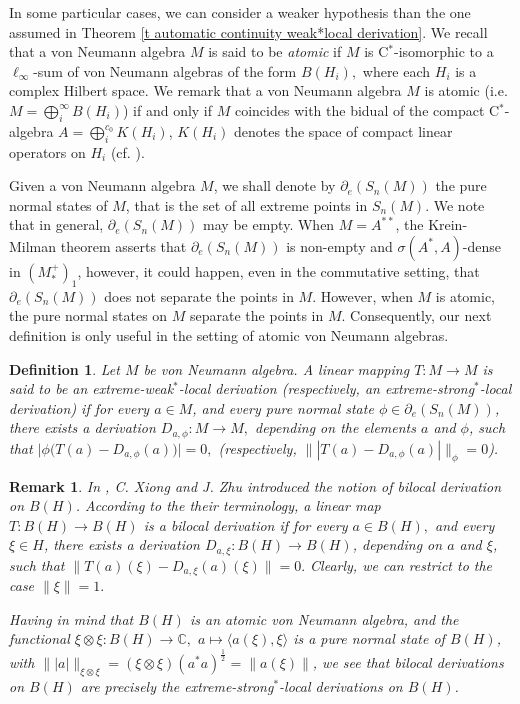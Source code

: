 \documentclass[11pt]{amsart}
\newtheorem{definition}[theorem]{Definition}
\newtheorem{remark}[theorem]{Remark}
\begin{document}
In some particular cases, we can consider a weaker hypothesis than the one assumed in Theorem \ref{t automatic continuity weak*local derivation}. We recall that a von Neumann algebra $M$ is said to be \emph{atomic} if $M$ is C$^*$-isomorphic to a $\ell_{\infty}$-sum of von Neumann algebras of the form $B(H_i),$ where each $H_i$ is a complex Hilbert space. We remark that a von Neumann algebra $M$ is atomic (i.e. $\displaystyle M= \bigoplus^{\infty}_{i} B(H_i)$) if and only if $M$ coincides with the bidual of the compact C$^*$-algebra $\displaystyle A= \bigoplus^{c_0}_{i} K(H_i)$, $K(H_i)$ denotes the space of compact linear operators on $H_i$ (cf. \cite[\S 1.19]{Sak}).\smallskip

Given a von Neumann algebra $M$, we shall denote by $\partial_{e} (S_n(M))$ the pure normal states of $M$, that is the set of all extreme points in $S_n(M)$. We note that in general, $\partial_{e} (S_n(M))$ may be empty. When $M= A^{**}$, the Krein-Milman theorem asserts that $\partial_{e} (S_n(M))$ is non-empty and $\sigma (A^*,A)$-dense in $\left(M_*^{+}\right)_1$, however, it could happen, even in the commutative setting, that $\partial_{e} (S_n(M))$ does not separate the points in $M$. However, when $M$ is atomic, the pure normal states on $M$ separate the points in $M$.
Consequently, our next definition is only useful in the setting of atomic von Neumann algebras.

\begin{definition}\label{def extreme weak$^*$-local derivation} Let $M$ be von Neumann algebra. A linear mapping $T: M \to M$ is said to be an extreme-weak$^*$-local derivation {\rm(}respectively, an extreme-strong$^*$-local derivation{\rm)} if for every $a\in M$, and every pure normal state $\phi\in \partial_{e} (S_n(M))$, there exists a derivation $D_{a,\phi}: M\to M,$ depending on the elements $a$ and $\phi$, such that $\Big|\phi \Big(T(a) - D_{a,\phi} (a)\Big)\Big|=0,$ {\rm(}respectively, $\||T(a) - D_{a,\phi} (a)|\|_{\phi }=0${\rm)}.
\end{definition}

\begin{remark}\label{reamrk bilocal derivations are extreme strong* derivations} In \cite{ZhuXiong97},  C. Xiong and J. Zhu introduced the notion of bilocal derivation on $B(H)$. According to the their terminology, a linear map $T: B(H)\to B(H)$ is a \emph{bilocal derivation} if for every $a\in B(H),$ and every $\xi\in H$, there exists a derivation $D_{a,\xi} : B(H)\to B(H)$, depending on $a$ and $\xi$, such that $\|T(a) (\xi) - D_{a,\xi} (a) (\xi)\|=0.$ Clearly, we can restrict to the case $\|\xi\|=1.$\smallskip

Having in mind that $B(H)$ is an atomic von Neumann algebra, and the functional $\xi\otimes \xi : B(H)\to \mathbb{C},$ $a\mapsto \langle a(\xi), \xi \rangle$ is a pure normal state of $B(H)$, with $\|| a|\|_{\xi\otimes \xi} = (\xi\otimes \xi) (a^* a)^{\frac12} = \|a(\xi)\|$, we see that bilocal derivations on $B(H)$ are precisely the extreme-strong$^*$-local derivations on $B(H)$.
\end{remark}
\end{document}
